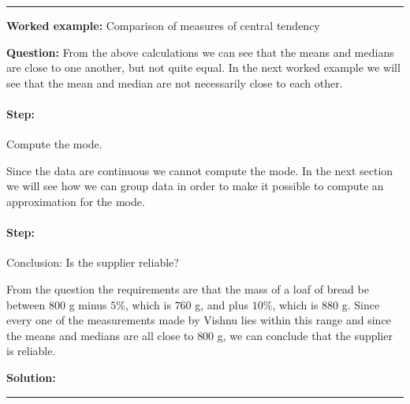 \documentclass[a4paper,11pt]{report}
\newenvironment{wex}[3]%
{\rule{\linewidth}{0.5mm}
\textbf{Worked example:} #1

\textbf{Question:} #2

\textbf{Solution:} #3}%
{\rule{\linewidth}{0.5mm}}
\newcommand{\westep}[1]{\paragraph{Step:} #1}
\begin{document}
\begin{wex}{Comparison of measures of central tendency}
{  From the above calculations we can see that the means and medians
  are close to one another, but not quite equal. In the next worked
  example we will see that the mean and median are not necessarily
  close to each other.

  \westep{Compute the mode.}

  Since the data are continuous we cannot compute the mode. In the next
  section we will see how we can group data in order to make it possible
  to compute an approximation for the mode.

  \westep{Conclusion: Is the supplier reliable?}

  From the question the requirements are that the mass of a loaf of
  bread be between $800$ g minus $5$\%, which is $760$ g, and plus
  $10$\%, which is $880$ g. Since every one of the measurements made
  by Vishnu lies within this range and since the means and medians are
  all close to $800$ g, we can conclude that the supplier is reliable.

}
\end{wex}
\end{document}
